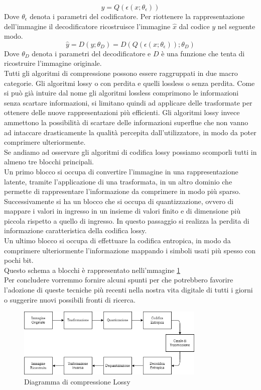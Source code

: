 \begin{equation}\label{eq:eqCondificatore}
    y = Q(\epsilon (x;\theta_{\epsilon}))
\end{equation}
Dove $\theta_{\epsilon}$ denota i parametri del codificatore.
Per riottenere la rappresentazione dell’immagine il decodificatore ricostruisce l’immagine $\hat{x}$ dal codice $y$ nel seguente modo.\\
\begin{equation}\label{eq:eqDecodificatore}
    \hat{y} = D(y;\theta_{D}) = D(Q(\epsilon (x;\theta_{\epsilon}));\theta_{D})
\end{equation}
Dove $\theta_{D}$ denota i parametri del decodificatore e $D$ è una funzione che tenta di ricostruire l'immagine originale.\cite{hu2021learning}\\
Tutti gli algoritmi di compressione possono essere raggruppati in due macro categorie. Gli algoritmi lossy o con perdita e quelli lossless o senza perdita. Come si può già intuire dal nome gli algoritmi lossless comprimono le informazioni senza scartare informazioni, si limitano quindi ad applicare delle trasformate per ottenere delle nuove rappresentazioni più efficienti. Gli algoritmi lossy invece ammettono la possibilità di scartare delle informazioni superflue che non vanno ad intaccare drasticamente la qualità percepita dall'utilizzatore, in modo da poter comprimere ulteriormente.\\
Se andiamo ad osservare gli algoritmi di codifica lossy possiamo scomporli tutti in almeno tre blocchi principali.\cite{sadeeq2021image} \\
Un primo blocco si occupa di convertire l’immagine in una rappresentazione latente, tramite l’applicazione di una trasformata, in un altro dominio che permette di rappresentare l’informazione da comprimere in modo più sparso.\\
Successivamente si ha un blocco che si occupa di quantizzazione, ovvero di mappare i valori in ingresso in un insieme di valori finito e di dimensione più piccola rispetto a quello di ingresso. In questo passaggio si realizza la perdita di informazione caratteristica della codifica lossy.\\
Un ultimo blocco si occupa di effettuare la codifica entropica, in modo da comprimere ulteriormente l’informazione mappando i simboli usati più spesso con pochi bit.\\
Questo schema a blocchi è rappresentato nelli'mmagine \ref{fig:LossyCompressorDiagram}\\
Per concludere vorremmo fornire alcuni spunti per che potrebbero favorire l’adozione di queste tecniche più recenti nella nostra vita digitale di tutti i giorni o suggerire nuovi possibili fronti di ricerca.
\begin{figure}[t!]
    \centering
    \includegraphics[width=0.8\textwidth]{Immagini/LossyCompressorDiagram.png}
    \caption{Diagramma di compressione Lossy}
    \label{fig:LossyCompressorDiagram}
\end{figure}
